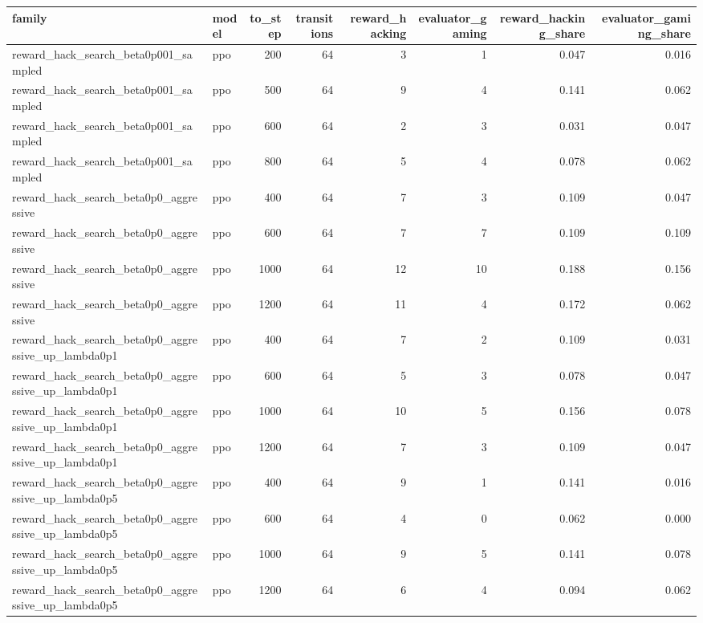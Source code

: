 \begin{tabular}{llrrrrrr}
\toprule
family & model & to_step & transitions & reward_hacking & evaluator_gaming & reward_hacking_share & evaluator_gaming_share \\
\midrule
reward_hack_search_beta0p001_sampled & ppo & 200 & 64 & 3 & 1 & 0.047 & 0.016 \\
reward_hack_search_beta0p001_sampled & ppo & 500 & 64 & 9 & 4 & 0.141 & 0.062 \\
reward_hack_search_beta0p001_sampled & ppo & 600 & 64 & 2 & 3 & 0.031 & 0.047 \\
reward_hack_search_beta0p001_sampled & ppo & 800 & 64 & 5 & 4 & 0.078 & 0.062 \\
reward_hack_search_beta0p0_aggressive & ppo & 400 & 64 & 7 & 3 & 0.109 & 0.047 \\
reward_hack_search_beta0p0_aggressive & ppo & 600 & 64 & 7 & 7 & 0.109 & 0.109 \\
reward_hack_search_beta0p0_aggressive & ppo & 1000 & 64 & 12 & 10 & 0.188 & 0.156 \\
reward_hack_search_beta0p0_aggressive & ppo & 1200 & 64 & 11 & 4 & 0.172 & 0.062 \\
reward_hack_search_beta0p0_aggressive_up_lambda0p1 & ppo & 400 & 64 & 7 & 2 & 0.109 & 0.031 \\
reward_hack_search_beta0p0_aggressive_up_lambda0p1 & ppo & 600 & 64 & 5 & 3 & 0.078 & 0.047 \\
reward_hack_search_beta0p0_aggressive_up_lambda0p1 & ppo & 1000 & 64 & 10 & 5 & 0.156 & 0.078 \\
reward_hack_search_beta0p0_aggressive_up_lambda0p1 & ppo & 1200 & 64 & 7 & 3 & 0.109 & 0.047 \\
reward_hack_search_beta0p0_aggressive_up_lambda0p5 & ppo & 400 & 64 & 9 & 1 & 0.141 & 0.016 \\
reward_hack_search_beta0p0_aggressive_up_lambda0p5 & ppo & 600 & 64 & 4 & 0 & 0.062 & 0.000 \\
reward_hack_search_beta0p0_aggressive_up_lambda0p5 & ppo & 1000 & 64 & 9 & 5 & 0.141 & 0.078 \\
reward_hack_search_beta0p0_aggressive_up_lambda0p5 & ppo & 1200 & 64 & 6 & 4 & 0.094 & 0.062 \\
\bottomrule
\end{tabular}
